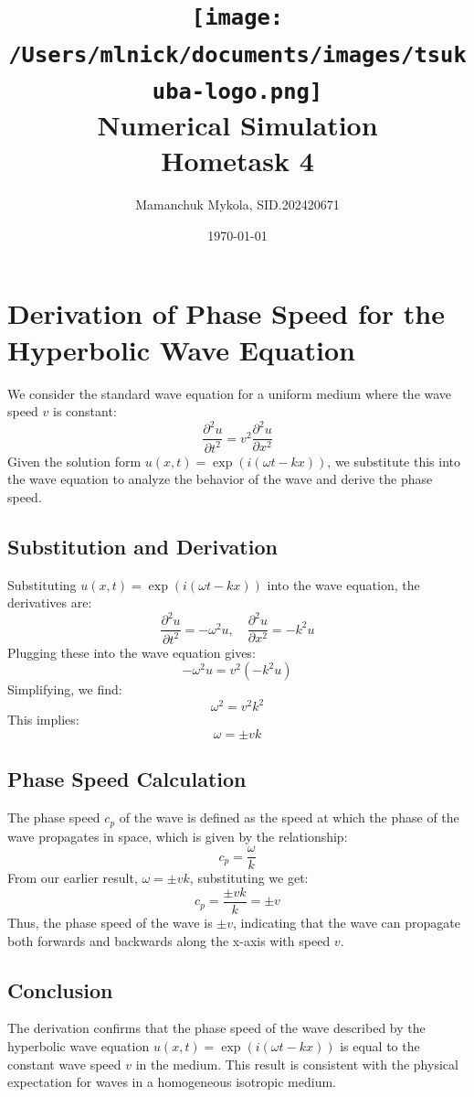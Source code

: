 \documentclass{article}
\title{
    \texttt{[image: /Users/mlnick/documents/images/tsukuba-logo.png]} \\
    \vspace{2mm}
    \textbf{Numerical Simulation} \\
    \vspace{3mm}    
    Hometask 4
}
\author{Mamanchuk Mykola, SID.202420671}
\date{\today}
\begin{document}
\maketitle


\setlength{\fboxsep}{0pt} %
\setlength{\fboxrule}{0.5pt} %

\section{Derivation of Phase Speed for the Hyperbolic Wave Equation}
We consider the standard wave equation for a uniform medium where the wave speed \( v \) is constant:
\[
\frac{\partial^2 u}{\partial t^2} = v^2 \frac{\partial^2 u}{\partial x^2}
\]
Given the solution form \( u(x,t) = \exp(i(\omega t - kx)) \), we substitute this into the wave equation to analyze the behavior of the wave and derive the phase speed.

\subsection{Substitution and Derivation}
Substituting \( u(x,t) = \exp(i(\omega t - kx)) \) into the wave equation, the derivatives are:
\[
\frac{\partial^2 u}{\partial t^2} = -\omega^2 u, \quad \frac{\partial^2 u}{\partial x^2} = -k^2 u
\]
Plugging these into the wave equation gives:
\[
-\omega^2 u = v^2 (-k^2 u)
\]
Simplifying, we find:
\[
\omega^2 = v^2 k^2
\]
This implies:
\[
\omega = \pm vk
\]

\subsection{Phase Speed Calculation}
The phase speed \( c_p \) of the wave is defined as the speed at which the phase of the wave propagates in space, which is given by the relationship:
\[
c_p = \frac{\omega}{k}
\]
From our earlier result, \( \omega = \pm vk \), substituting we get:
\[
c_p = \frac{\pm vk}{k} = \pm v
\]
Thus, the phase speed of the wave is \( \pm v \), indicating that the wave can propagate both forwards and backwards along the x-axis with speed \( v \).

\subsection{Conclusion}
The derivation confirms that the phase speed of the wave described by the hyperbolic wave equation \( u(x,t) = \exp(i(\omega t - kx)) \) is equal to the constant wave speed \( v \) in the medium. This result is consistent with the physical expectation for waves in a homogeneous isotropic medium.
\end{document}
